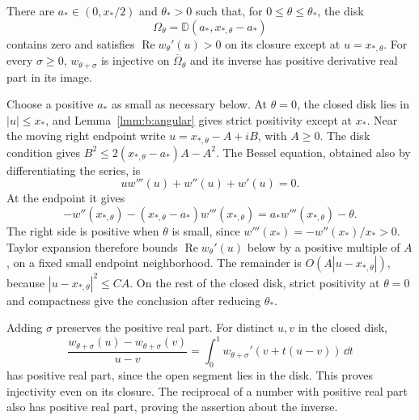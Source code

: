 \begin{lmm}\label{lmm:b:convex-domain}
There are $a_*\in(0,x_*/2)$ and $\theta_*>0$ such that, for
$0\leq\theta\leq\theta_*$, the disk
\begin{equation}\label{eq:b:omega}
 \Omega_\theta=\mathbb D(a_*,x_{*,\theta}-a_*)
\end{equation}
contains zero and satisfies
$\operatorname{Re}w_\theta'(u)>0$ on its closure except at
$u=x_{*,\theta}$. For every $\sigma\geq0$, $w_{\theta+\sigma}$
is injective on $\overline\Omega_\theta$ and its inverse has positive
derivative real part in its image.
\end{lmm}
\begin{prf}
Choose a positive $a_*$ as small as necessary below.
At $\theta=0$, the closed disk lies in $|u|\leq x_*$, and
Lemma~\ref{lmm:b:angular} gives strict positivity except at $x_*$.
Near the moving right endpoint write
$u=x_{*,\theta}-A+iB$, with $A\geq0$. The disk condition gives
$B^2\leq2(x_{*,\theta}-a_*)A-A^2$. The Bessel equation, obtained
also by differentiating the series, is
\begin{equation}\label{eq:b:bessel-ode}
 u w'''(u)+w''(u)+w'(u)=0.
\end{equation}
At the endpoint it gives
\[
 -w''(x_{*,\theta})
 -(x_{*,\theta}-a_*)w'''(x_{*,\theta})
                      =a_*w'''(x_{*,\theta})-\theta.
\]
The right side is positive when $\theta$ is small, since
$w'''(x_*)=-w''(x_*)/x_*>0$. Taylor expansion therefore bounds
$\operatorname{Re}w_\theta'(u)$ below by a positive multiple of
$A$, on a fixed small endpoint neighborhood. The remainder is
$O(A|u-x_{*,\theta}|)$, because $|u-x_{*,\theta}|^2\leq C A$.
On the rest of the closed disk, strict positivity at $\theta=0$
and compactness give the conclusion after reducing $\theta_*$.

Adding $\sigma$ preserves the positive real part. For distinct
$u,v$ in the closed disk,
\[
 \frac{w_{\theta+\sigma}(u)-w_{\theta+\sigma}(v)}{u-v}
 =\int_0^1w_{\theta+\sigma}'(v+t(u-v))\,\dd t
\]
has positive real part, since the open segment lies in the disk.
This proves injectivity even on its closure. The reciprocal of a
number with positive real part also has positive real part, proving
the assertion about the inverse.
\end{prf}

